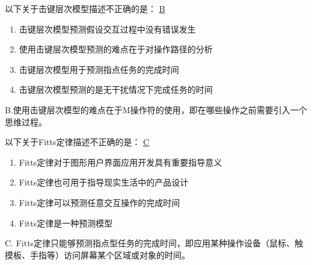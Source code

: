\begin{problem}
	以下关于击键层次模型描述不正确的是：
	\uline{B}    
        \begin{enumerate}[label=\Alph*.]
            \item 击键层次模型预测假设交互过程中没有错误发生
            \item 使用击键层次模型预测的难点在于对操作路径的分析
            \item 击键层次模型用于预测指点任务的完成时间
            \item 击键层次模型预测的是无干扰情况下完成任务的时间
        \end{enumerate}
\end{problem}

\begin{solution}
B.使用击键层次模型的难点在于M操作符的使用，即在哪些操作之前需要引入一个思维过程。
\end{solution}


\begin{problem}
	以下关于Fitts定律描述不正确的是：
	\uline{C}    
        \begin{enumerate}[label=\Alph*.]
            \item Fitts定律对于图形用户界面应用开发具有重要指导意义
            \item Fitts定律也可用于指导现实生活中的产品设计
            \item Fitts定律可以预测任意交互操作的完成时间
            \item Fitts定律是一种预测模型
        \end{enumerate}
\end{problem}

\begin{solution}
C. Fitts定律只能够预测指点型任务的完成时间，即应用某种操作设备（鼠标、触摸板、手指等）访问屏幕某个区域或对象的时间。
\end{solution}


